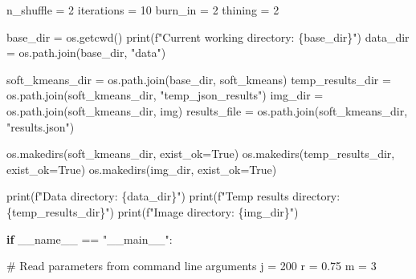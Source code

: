\documentclass[
  letterpaper,
  DIV=11,
  numbers=noendperiod]{scrreprt}
\newenvironment{Shaded}{\begin{snugshade}}{\end{snugshade}}
\newcommand{\BuiltInTok}[1]{\textcolor[rgb]{0.00,0.23,0.31}{#1}}
\newcommand{\CommentTok}[1]{\textcolor[rgb]{0.37,0.37,0.37}{#1}}
\newcommand{\ControlFlowTok}[1]{\textcolor[rgb]{0.00,0.23,0.31}{\textbf{#1}}}
\newcommand{\DecValTok}[1]{\textcolor[rgb]{0.68,0.00,0.00}{#1}}
\newcommand{\FloatTok}[1]{\textcolor[rgb]{0.68,0.00,0.00}{#1}}
\newcommand{\NormalTok}[1]{\textcolor[rgb]{0.00,0.23,0.31}{#1}}
\newcommand{\OperatorTok}[1]{\textcolor[rgb]{0.37,0.37,0.37}{#1}}
\newcommand{\SpecialCharTok}[1]{\textcolor[rgb]{0.37,0.37,0.37}{#1}}
\newcommand{\SpecialStringTok}[1]{\textcolor[rgb]{0.13,0.47,0.30}{#1}}
\newcommand{\StringTok}[1]{\textcolor[rgb]{0.13,0.47,0.30}{#1}}
\newcommand{\VariableTok}[1]{\textcolor[rgb]{0.07,0.07,0.07}{#1}}
\begin{document}
\begin{Shaded}
\begin{Highlighting}[]
\NormalTok{n\_shuffle }\OperatorTok{=} \DecValTok{2}
\NormalTok{iterations }\OperatorTok{=} \DecValTok{10}
\NormalTok{burn\_in }\OperatorTok{=} \DecValTok{2}
\NormalTok{thining }\OperatorTok{=} \DecValTok{2}

\NormalTok{base\_dir }\OperatorTok{=}\NormalTok{ os.getcwd()}
\BuiltInTok{print}\NormalTok{(}\SpecialStringTok{f"Current working directory: }\SpecialCharTok{\{}\NormalTok{base\_dir}\SpecialCharTok{\}}\SpecialStringTok{"}\NormalTok{)}
\NormalTok{data\_dir }\OperatorTok{=}\NormalTok{ os.path.join(base\_dir, }\StringTok{"data"}\NormalTok{)}

\NormalTok{soft\_kmeans\_dir }\OperatorTok{=}\NormalTok{ os.path.join(base\_dir, }\StringTok{\textquotesingle{}soft\_kmeans\textquotesingle{}}\NormalTok{)}
\NormalTok{temp\_results\_dir }\OperatorTok{=}\NormalTok{ os.path.join(soft\_kmeans\_dir, }\StringTok{"temp\_json\_results"}\NormalTok{)}
\NormalTok{img\_dir }\OperatorTok{=}\NormalTok{ os.path.join(soft\_kmeans\_dir, }\StringTok{\textquotesingle{}img\textquotesingle{}}\NormalTok{)}
\NormalTok{results\_file }\OperatorTok{=}\NormalTok{ os.path.join(soft\_kmeans\_dir, }\StringTok{"results.json"}\NormalTok{)}

\NormalTok{os.makedirs(soft\_kmeans\_dir, exist\_ok}\OperatorTok{=}\VariableTok{True}\NormalTok{)}
\NormalTok{os.makedirs(temp\_results\_dir, exist\_ok}\OperatorTok{=}\VariableTok{True}\NormalTok{)}
\NormalTok{os.makedirs(img\_dir, exist\_ok}\OperatorTok{=}\VariableTok{True}\NormalTok{)}

\BuiltInTok{print}\NormalTok{(}\SpecialStringTok{f"Data directory: }\SpecialCharTok{\{}\NormalTok{data\_dir}\SpecialCharTok{\}}\SpecialStringTok{"}\NormalTok{)}
\BuiltInTok{print}\NormalTok{(}\SpecialStringTok{f"Temp results directory: }\SpecialCharTok{\{}\NormalTok{temp\_results\_dir}\SpecialCharTok{\}}\SpecialStringTok{"}\NormalTok{)}
\BuiltInTok{print}\NormalTok{(}\SpecialStringTok{f"Image directory: }\SpecialCharTok{\{}\NormalTok{img\_dir}\SpecialCharTok{\}}\SpecialStringTok{"}\NormalTok{)}

\ControlFlowTok{if} \VariableTok{\_\_name\_\_} \OperatorTok{==} \StringTok{"\_\_main\_\_"}\NormalTok{:}

    \CommentTok{\# Read parameters from command line arguments}
\NormalTok{    j }\OperatorTok{=} \DecValTok{200}
\NormalTok{    r }\OperatorTok{=} \FloatTok{0.75}
\NormalTok{    m }\OperatorTok{=} \DecValTok{3}


\end{Highlighting}
\end{Shaded}
\end{document}
